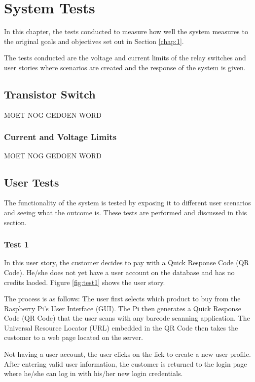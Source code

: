 \chapter{System Tests}

In this chapter, the tests  conducted to measure how well the system measures to the
original goals and objectives set out in Section \ref{chap:1}. 

The tests conducted are the voltage and current limits of the relay switches and user
stories where scenarios are created and the response of the system is given. 

\section{Transistor Switch}

MOET NOG GEDOEN WORD

\subsection{Current and Voltage Limits}

MOET NOG GEDOEN WORD

\section{User Tests}

The functionality of the system is tested by exposing it to different user scenarios and
seeing what the outcome is. These tests are performed and discussed in this section.

\subsection{Test 1}

In this user story, the customer decides to pay with a Quick Response Code (QR Code).
He/she does not yet have a user account on the database and has no credits laoded. Figure
\ref{fig:test1} shows the user story. 

The process is as follows: The user first selects which product to buy from the Raspberry
Pi's User Interface (GUI). The Pi then generates a Quick Response Code (QR Code) that the
user scans with any barcode scanning application. The Universal Resource Locator (URL)
embedded in the QR Code then takes the customer to a web page located on the server. 

Not having a user account, the user clicks on the lick to create a new user profile. After
entering valid user information, the customer is returned to the login  page where he/she
can log in with his/her new login credentials. 

